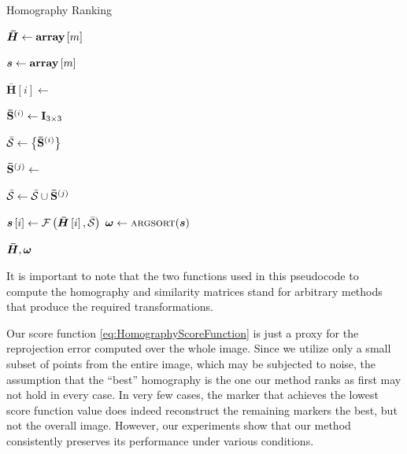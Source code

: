 \def\hmatrices{\boldsymbol{\bar{H}}}
\def\scoref{\mathcal{F}}

\begin{algorithm}[t]
    \caption{Homography Ranking}
    \label{alg:HomographyRanking}
    \begin{algorithmic}[1]
        \State $\hmatrices \gets \arraydef \left[ m \right]$
        
        \State $\boldsymbol{s} \gets {\text{\textbf{array}}} \left[ m \right]$
        
        
            \State $\hmatrices \left[ i \right] \gets$
            
            \State ${\mathbf{\bar{S}}}^{\left( {i} \right)} \gets \mathbf{I}_{3 \times 3}$
            
            \State $\mathcal{\bar{S}} \gets \left\{ {{\mathbf{\bar{S}}}^{\left( {i} \right)}} \right\}$
            
            
                \State ${\mathbf{\bar{S}}}^{\left( {j} \right)} \gets$ \Call{similarity}{$\hmatrices \left[ i \right] \cdot \suprbrackets{\mtx{W}}{j}$, $\mtx{T }$}
                
                \State$\mathcal{\bar{S}} \gets \mathcal{\bar{S}} \cup {\mathbf{\bar{S}}}^{\left( {j} \right)}$
            \EndFor
            
            \State $\scores \left[ i \right] \gets \func{\scoref}{\hmatrices \left[ i \right], \mset{\bar{S}}}$
        \EndFor
        \State $\sortres \gets \Call{argsort}{\scores}$
        
        \State \Return $\hmatrices, \sortres$
    \end{algorithmic}
\end{algorithm}

It is important to note that the two functions used in this pseudocode to compute the homography and similarity matrices stand for arbitrary methods that produce the required transformations.

Our score function \eqref{eq:HomographyScoreFunction} is just a proxy for the reprojection error computed over the whole image. Since we utilize only a small subset of points from the entire image, which may be subjected to noise, the assumption that the ``best'' homography is the one our method ranks as first may not hold in every case. In very few cases, the marker that achieves the lowest score function value does indeed reconstruct the remaining markers the best, but not the overall image. However, our experiments show that our method consistently preserves its performance under various conditions.

